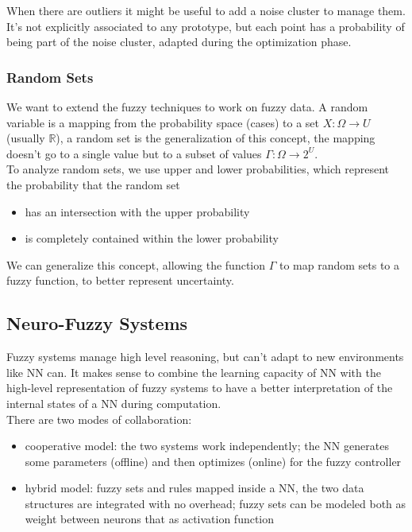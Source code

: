 When there are outliers it might be useful to add a noise cluster to manage them. It's not explicitly associated to any prototype, but each point has a probability of being part of the noise cluster, adapted during the optimization phase.\\

\subsubsection{Random Sets}
We want to extend the fuzzy techniques to work on fuzzy data. A random variable is a mapping from the probability space (cases) to a set $X: \Omega \rightarrow U$ (usually $\mathbb{R}$), a random set is the generalization of this concept, the mapping doesn't go to a single value but to a subset of values $\Gamma: \Omega \rightarrow 2^U$. \\

To analyze random sets, we use upper and lower probabilities, which represent the probability that the random set
\begin{itemize}
	\item has an intersection with the upper probability
	\item is completely contained within the lower probability
\end{itemize}

We can generalize this concept, allowing the function $\Gamma$ to map random sets to a fuzzy function, to better represent uncertainty.\\

\subsection{Neuro-Fuzzy Systems}

Fuzzy systems manage high level reasoning, but can't adapt to new environments like NN can. It makes sense to combine the learning capacity of NN with the high-level representation of fuzzy systems to have a better interpretation of the internal states of a NN during computation.\\

There are two modes of collaboration: 
\begin{itemize}
	\item cooperative model: the two systems work independently; the NN generates some parameters (offline) and then optimizes (online) for the fuzzy controller
	\item hybrid model: fuzzy sets and rules mapped inside a NN, the two data structures are integrated with no overhead; fuzzy sets can be modeled both as weight between neurons that as activation function
\end{itemize}




